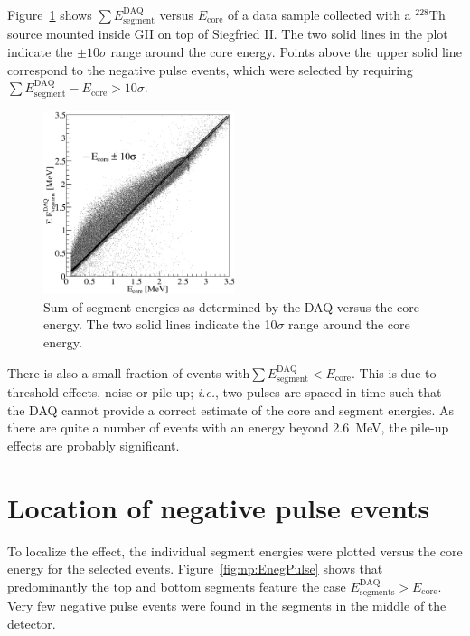 Figure~\ref{fig:np:sEnegPulse} shows $\sum
E^{\text{DAQ}}_{\text{segment}}$ versus $E_{\text{core}}$ of a data
sample collected with a $^{228}$Th source mounted inside GII on top of
Siegfried II. The two solid lines in the plot indicate the $\pm 10
\sigma$ range around the core energy. Points above the upper solid
line correspond to the negative pulse events, which were selected by
requiring $\sum E^{\text{DAQ}}_{\text{segment}} - E_{\text{core}} >
10\sigma$.

\begin{figure}[tphb]
\centering
\includegraphics[width=0.5\textwidth]{sEnegPuls}
\caption{Sum of segment energies as determined by the DAQ versus the
core energy. The two solid lines indicate the 10$\sigma$ range around
the core energy.}
\label{fig:np:sEnegPulse}
\end{figure}

There is also a small fraction of events with$\sum
E^{\text{DAQ}}_{\text{segment}} < E_{\text{core}}$. This is due to
threshold-effects, noise or pile-up; \textit{i.e.}, two pulses are
spaced in time such that the DAQ cannot provide a correct estimate of
the core and segment energies. As there are quite a number of events
with an energy beyond 2.6~MeV, the pile-up effects are probably
significant.

\section{Location of negative pulse events}
\label{sec:np:locneg}
To localize the effect, the individual segment energies were plotted
versus the core energy for the selected
events. Figure~\ref{fig:np:EnegPulse} shows that predominantly the top
and bottom segments feature the case $E^{\text{DAQ}}_{\text{segments}} >
E_{\text{core}}$. Very few negative pulse events were found in the
segments in the middle of the detector.
 
